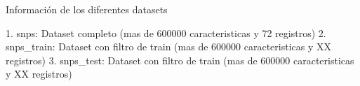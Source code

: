 Información de los diferentes datasets

1. snps: Dataset completo (mas de 600000 caracteristicas y 72 registros)
2. snps_train: Dataset con filtro de train (mas de 600000 caracteristicas y XX registros)
3. snps_test:  Dataset con filtro de train (mas de 600000 caracteristicas y XX registros)
